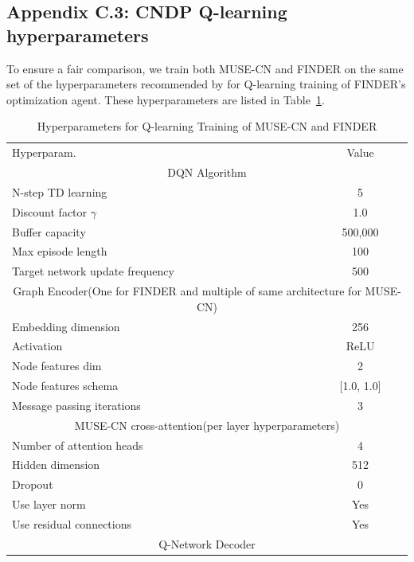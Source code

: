 \documentclass{article}
\begin{document}
\subsection{Appendix C.3: CNDP Q-learning hyperparameters}
\label{app:q_learning_hyperparameters}


To ensure a fair comparison, we train both MUSE-CN and FINDER on the same set of the hyperparameters recommended by \citet{fan2020finding} for Q-learning training of FINDER's optimization agent. These hyperparameters are listed in Table~\ref{tab:Q_learning_hyperparameters}.

\begin{table}[H]
    \centering
    \caption{Hyperparameters for Q-learning Training of MUSE-CN and FINDER}
    \label{tab:Q_learning_hyperparameters}
    \begin{tabular}{l|c}
    \toprule 
    Hyperparam. & Value \\
    \cmidrule(r){1-2} 
    \multicolumn{2}{c}{DQN Algorithm}\\
    \cmidrule(r){1-2} 
    N-step TD learning & 5 \\
    Discount factor $\gamma$ & 1.0 \\
    Buffer capacity & 500,000 \\
    Max episode length & 100 \\
    Target network update frequency & 500 \\
    \cmidrule(r){1-2} 
    \multicolumn{2}{c}{Graph Encoder\tiny{(One for FINDER and multiple of same architecture for MUSE-CN)}}\\
    \cmidrule(r){1-2} 
    Embedding dimension & 256 \\
    Activation & ReLU \\
    Node features dim & 2 \\
    Node features schema & [1.0, 1.0] \\
    Message passing iterations & 3 \\
    \cmidrule(r){1-2} 
    \cmidrule(r){1-2} 
    \multicolumn{2}{c}{MUSE-CN cross-attention\tiny{(per layer hyperparameters)}}\\
    \cmidrule(r){1-2} 
    Number of attention heads & 4 \\
    Hidden dimension & 512 \\
    Dropout & 0 \\
    Use layer norm & Yes \\
    Use residual connections & Yes \\
    \cmidrule(r){1-2} 
    \multicolumn{2}{c}{Q-Network Decoder}\\

\end{tabular}
\end{table}
\end{document}
